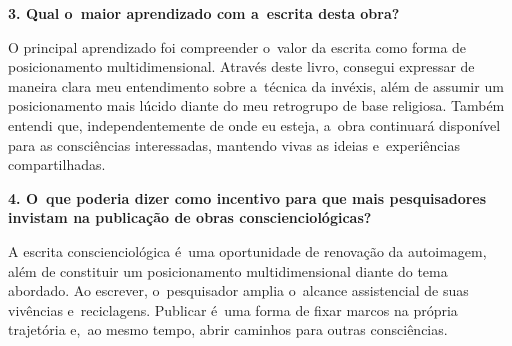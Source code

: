 \documentclass{gescons}
\begin{document}
\begin{multicols}{2}
\textbf{3. Qual o~maior aprendizado com a~escrita desta obra?}

O principal aprendizado foi compreender o~valor da escrita como forma de posicionamento multidimensional. Através deste livro, consegui expressar de maneira clara meu entendimento sobre a~técnica da invéxis, além de assumir um posicionamento mais lúcido diante do meu retrogrupo de base religiosa. Também entendi que, independentemente de onde eu esteja, a~obra continuará disponível para as consciências interessadas, mantendo vivas as ideias e~experiências compartilhadas.

\textbf{4. O~que poderia dizer como incentivo para que mais pesquisadores invistam na publicação de obras conscienciológicas?}

A escrita conscienciológica é~uma oportunidade de renovação da autoimagem, além de constituir um posicionamento multidimensional diante do tema abordado. Ao escrever, o~pesquisador amplia o~alcance assistencial de suas vivências e~reciclagens. Publicar é~uma forma de fixar marcos na própria trajetória e,~ao mesmo tempo, abrir caminhos para outras consciências.
    
    
    \end{multicols}
\end{document}
